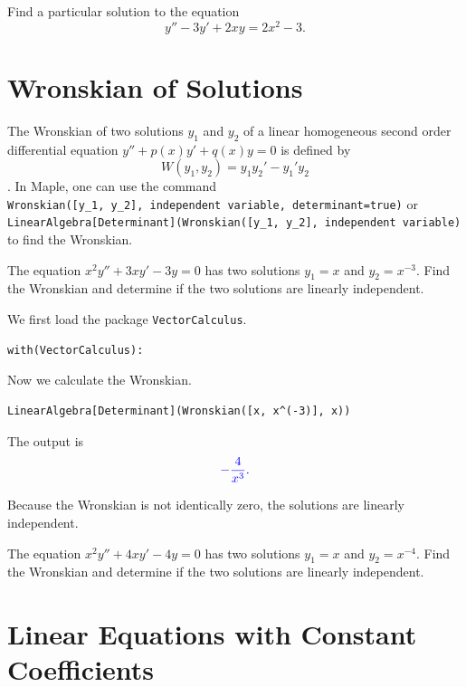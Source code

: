 \documentclass[
  12pt]{elegantbook}
\begin{document}
\begin{exercise}
Find a particular solution to the equation
\[y''-3y'+2xy=2x^2-3.\]
\end{exercise}

\hypertarget{wronskian-of-solutions}{%
\section{Wronskian of Solutions}\label{wronskian-of-solutions}}

The Wronskian of two solutions \(y_1\) and \(y_2\) of a linear homogeneous second order differential equation \(y''+p(x)y'+q(x)y=0\) is defined by
\[W(y_1, y_2)=y_1y_2'-y_1'y_2\]. In Maple, one can use the command \texttt{Wronskian({[}y\_1,\ y\_2{]},\ independent\ variable,\ determinant=true)} or \texttt{LinearAlgebra{[}Determinant{]}(Wronskian({[}y\_1,\ y\_2{]},\ independent\ variable)} to find the Wronskian.

\begin{example}
The equation \(x^2y''+ 3xy'-3y=0\) has two solutions \(y_1=x\) and \(y_2=x^{-3}\). Find the Wronskian and determine if the two solutions are linearly independent.
\end{example}

\begin{solution}
We first load the package \texttt{VectorCalculus}.

\begin{verbatim}
with(VectorCalculus):
\end{verbatim}

Now we calculate the Wronskian.

\begin{verbatim}
LinearAlgebra[Determinant](Wronskian([x, x^(-3)], x))
\end{verbatim}

The output is
\[\color{blue}{-\frac{4}{x^{3}}}.\]

Because the Wronskian is not identically zero, the solutions are linearly independent.
\end{solution}

\begin{exercise}
The equation \(x^2y''+ 4xy'-4y=0\) has two solutions \(y_1=x\) and \(y_2=x^{-4}\). Find the Wronskian and determine if the two solutions are linearly independent.
\end{exercise}

\hypertarget{linear-equations-with-constant-coefficients}{%
\section{Linear Equations with Constant Coefficients}\label{linear-equations-with-constant-coefficients}}
\end{document}
